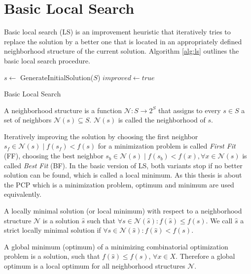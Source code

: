 \section{Basic Local Search}
Basic local search (LS) is an improvement heuristic that iteratively tries to replace the solution by a better one that is located in an appropriately defined neighborhood structure of the current solution.\cite{blum-05} Algorithm \ref{alg:ls} outlines the basic local search procedure. 
\begin{algorithm}[h]
$s \gets$ GenerateInitialSolution($S$)\;
$improved \gets true$\;
\caption{Basic Local Search}
\label{alg:ls}
\end{algorithm}
\begin{definition}
A neighborhood structure is a function $\mathcal{N} : S \rightarrow 2^S$ that assigns to every $s \in S$ a set of neighbors $\mathcal{N}(s) \subseteq S$. $\mathcal{N}(s)$ is called the neighborhood of $s$.
\end{definition}
Iteratively improving the solution by choosing the first neighbor $s_f \in \mathcal{N}(s) \mid f(s_f)<f(s)$ for a minimization problem is called \textit{First Fit} (FF), choosing the best neighbor $s_b \in \mathcal{N}(s) \mid f(s_b)<f(x), \forall x\in \mathcal{N}(s)$ is called \textit{Best Fit} (BF). In the basic version of LS, both variants stop if no better solution can be found, which is called a local minimum. As this thesis is about the PCP which is a minimization problem, optimum and minimum are used equivalently.
\begin{definition}
A locally minimal solution (or local minimum) with respect to a neighborhood structure $\mathcal{N}$ is a solution $\hat{s}$ such that $\forall s \in \mathcal{N}(\hat{s}):f(\hat{s})\leq f(s)$. We call $\hat{s}$ a strict locally minimal solution if $\forall s \in \mathcal{N}(\hat{s}) : f(\hat{s})<f(s)$.
\end{definition}
\begin{definition}
A global minimum (optimum) of a minimizing combinatorial optimization problem is a solution, such that $f(\hat{s}) \leq f(s)$, $\forall x \in X$. Therefore a global optimum is a local optimum for all neighborhood structures $\mathcal{N}$.
\end{definition}
